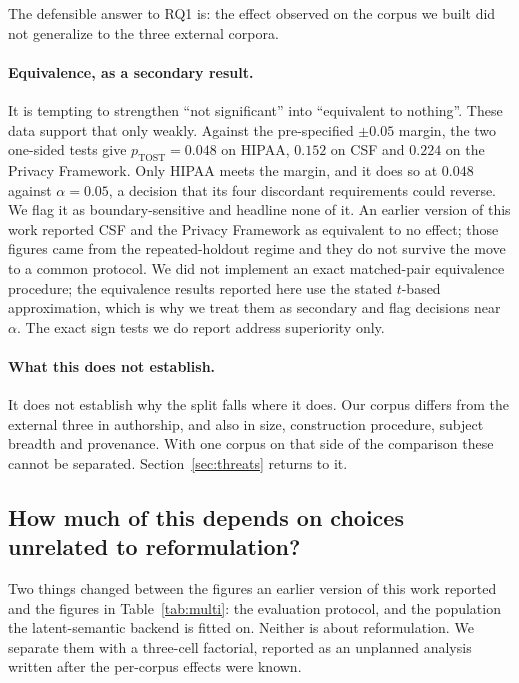 \documentclass[a4paper,fleqn]{cas-sc}
\begin{document}
The defensible answer to RQ1 is: the effect observed on the corpus we built did not generalize to the three external corpora.

\paragraph{Equivalence, as a secondary result.}
It is tempting to strengthen ``not significant'' into ``equivalent to nothing''. These data support that only weakly. Against the pre-specified $\pm 0.05$ margin, the two one-sided tests give $p_{\text{TOST}} = 0.048$ on HIPAA, $0.152$ on CSF and $0.224$ on the Privacy Framework. Only HIPAA meets the margin, and it does so at $0.048$ against $\alpha = 0.05$, a decision that its four discordant requirements could reverse. We flag it as boundary-sensitive and headline none of it. An earlier version of this work reported CSF and the Privacy Framework as equivalent to no effect; those figures came from the repeated-holdout regime and they do not survive the move to a common protocol. We did not implement an exact matched-pair equivalence procedure; the equivalence results reported here use the stated $t$-based approximation, which is why we treat them as secondary and flag decisions near $\alpha$. The exact sign tests we do report address superiority only.

\paragraph{What this does not establish.}
It does not establish why the split falls where it does. Our corpus differs from the external three in authorship, and also in size, construction procedure, subject breadth and provenance. With one corpus on that side of the comparison these cannot be separated. Section~\ref{sec:threats} returns to it.

\subsection{How much of this depends on choices unrelated to reformulation?}
\label{sec:results-lsi}

Two things changed between the figures an earlier version of this work reported and the figures in Table~\ref{tab:multi}: the evaluation protocol, and the population the latent-semantic backend is fitted on. Neither is about reformulation. We separate them with a three-cell factorial, reported as an unplanned analysis written after the per-corpus effects were known.
\end{document}
